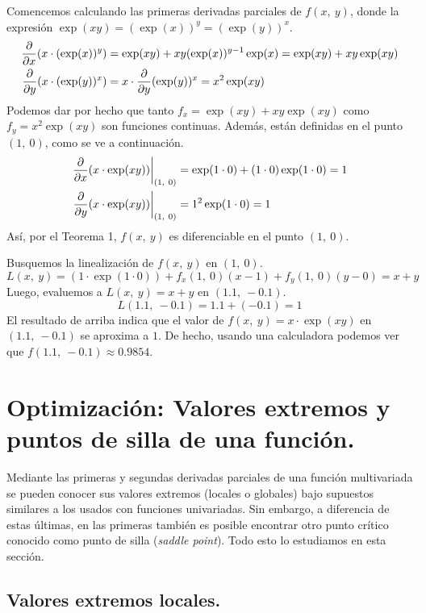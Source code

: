 \documentclass[12pt]{article}
\begin{document}
\solucion Comencemos calculando las primeras derivadas parciales de $f(x, \ y)$, donde la expresión $\exp(xy) = (\exp(x))^{y} = (\exp(y))^{x}$.
\begin{align*}
\frac{\partial }{\partial x} (x \cdot (\exp(x))^{y}) &= \exp(xy) + xy (\exp(x))^{y - 1} \exp(x) = \exp(xy) + xy \exp(xy) \\
\frac{\partial }{\partial y} (x \cdot (\exp(y))^{x}) &= x \cdot \frac{\partial }{\partial y} (\exp(y))^{x} = x^{2} \exp(xy)
\end{align*}
Podemos dar por hecho que tanto $f_{x} = \exp(xy) + xy \exp(xy)$ como $f_{y} = x^{2} \exp(xy)$ son funciones continuas. Además, están definidas en el punto $(1, \ 0)$, como se ve a continuación.
\begin{align*}
 \left.\frac{\partial }{\partial x} (x \cdot \exp(xy)) \right|_{(1, \ 0)} &= \exp(1 \cdot 0) + (1 \cdot 0) \exp(1 \cdot 0) = 1 \\
 \left.\frac{\partial }{\partial y} (x \cdot \exp(xy)) \right|_{(1, \ 0)} &= 1^{2} \exp(1 \cdot 0) = 1
\end{align*}
Así, por el Teorema 1, $f(x, \ y)$ es diferenciable en el punto $(1, \ 0)$.

Busquemos la linealización de $f(x, \ y)$ en $(1, \ 0)$.
\[
  L(x, \ y) = (1 \cdot \exp(1 \cdot 0)) + f_{x}(1, \ 0)(x - 1) + f_{y}(1, \ 0)(y - 0)
            = x + y
\]
Luego, evaluemos a $L(x, \ y) = x + y$ en $(1.1, \ -0.1)$.
\[
  L(1.1, \ -0.1) = 1.1 + (-0.1) = 1
\]
El resultado de arriba indica que el valor de $f(x, \ y) = x \cdot \exp(xy)$ en $(1.1, \ -0.1)$ se aproxima a $1$. De hecho, usando una calculadora podemos ver que $f(1.1, \ -0.1) \approx 0.9854$.


\section{Optimización: Valores extremos y puntos de silla de una función.}

Mediante las primeras y segundas derivadas parciales de una función multivariada se pueden conocer sus valores extremos (locales o globales) bajo supuestos similares a los usados con funciones univariadas. Sin embargo, a diferencia de estas últimas, en las primeras también es posible encontrar otro punto crítico conocido como punto de silla (\textit{saddle point}). Todo esto lo estudiamos en esta sección.

\subsection{Valores extremos locales.}
\end{document}
